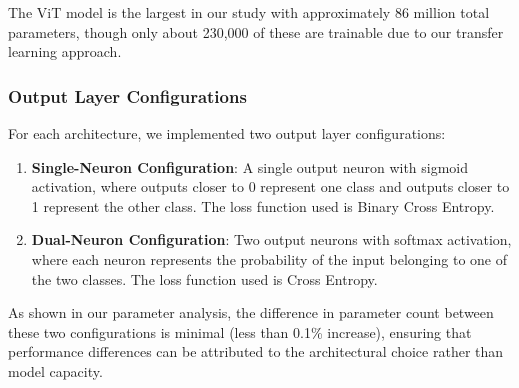 The ViT model is the largest in our study with approximately 86 million total parameters, though only about 230,000 of these are trainable due to our transfer learning approach.

\subsubsection{Output Layer Configurations}

For each architecture, we implemented two output layer configurations:

\begin{enumerate}
\item \textbf{Single-Neuron Configuration}: A single output neuron with sigmoid activation, where outputs closer to 0 represent one class and outputs closer to 1 represent the other class. The loss function used is Binary Cross Entropy.

\item \textbf{Dual-Neuron Configuration}: Two output neurons with softmax activation, where each neuron represents the probability of the input belonging to one of the two classes. The loss function used is Cross Entropy.
\end{enumerate}

As shown in our parameter analysis, the difference in parameter count between these two configurations is minimal (less than 0.1\% increase), ensuring that performance differences can be attributed to the architectural choice rather than model capacity.
